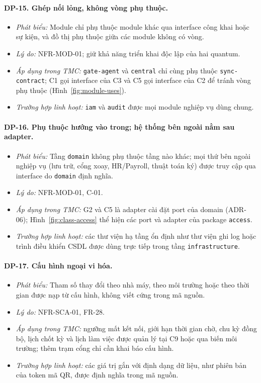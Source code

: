 \paragraph{DP-15. Ghép nối lỏng, không vòng phụ thuộc.}\label{dp:15}
\begin{itemize}
    \item \textit{Phát biểu:} Module chỉ phụ thuộc module khác qua interface công khai hoặc sự kiện, và đồ thị phụ thuộc giữa các module không có vòng.
    \item \textit{Lý do:} NFR-MOD-01; giữ khả năng triển khai độc lập của hai quantum.
    \item \textit{Áp dụng trong TMC:} \texttt{gate-agent} và \texttt{central} chỉ cùng phụ thuộc \texttt{sync-contract}; C1 gọi interface của C3 và C5 gọi interface của C2 để tránh vòng phụ thuộc (Hình~\ref{fig:module-uses}).
    \item \textit{Trường hợp linh hoạt:} \texttt{iam} và \texttt{audit} được mọi module nghiệp vụ dùng chung.
\end{itemize}

\paragraph{DP-16. Phụ thuộc hướng vào trong; hệ thống bên ngoài nằm sau adapter.}\label{dp:16}
\begin{itemize}
    \item \textit{Phát biểu:} Tầng \texttt{domain} không phụ thuộc tầng nào khác; mọi thứ bên ngoài nghiệp vụ (lưu trữ, cổng xoay, HR/Payroll, thuật toán ký) được truy cập qua interface do \texttt{domain} định nghĩa.
    \item \textit{Lý do:} NFR-MOD-01, C-01.
    \item \textit{Áp dụng trong TMC:} G2 và C5 là adapter cài đặt port của domain (ADR-06); Hình~\ref{fig:class-access} thể hiện các port và adapter của package \texttt{access}.
    \item \textit{Trường hợp linh hoạt:} các thư viện hạ tầng ổn định như thư viện ghi log hoặc trình điều khiển CSDL được dùng trực tiếp trong tầng \texttt{infrastructure}.
\end{itemize}

\paragraph{DP-17. Cấu hình ngoại vi hóa.}\label{dp:17}
\begin{itemize}
    \item \textit{Phát biểu:} Tham số thay đổi theo nhà máy, theo môi trường hoặc theo thời gian được nạp từ cấu hình, không viết cứng trong mã nguồn.
    \item \textit{Lý do:} NFR-SCA-01, FR-28.
    \item \textit{Áp dụng trong TMC:} ngưỡng mất kết nối, giới hạn thời gian chờ, chu kỳ đồng bộ, lịch chốt kỳ và lịch làm việc được quản lý tại C9 hoặc qua biến môi trường; thêm trạm cổng chỉ cần khai báo cấu hình.
    \item \textit{Trường hợp linh hoạt:} các giá trị gắn với định dạng dữ liệu, như phiên bản của token mã QR, được định nghĩa trong mã nguồn.
\end{itemize}

